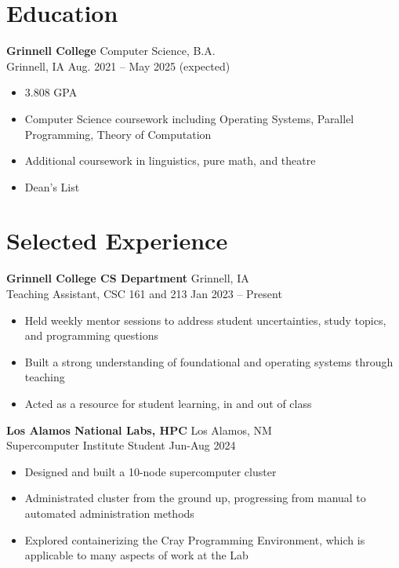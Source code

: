\documentclass[12pt]{article}
\newcommand{\entry}[4]{{{\textbf{#1}}} \hfill #3 \\ #2 \hfill #4}
\begin{document}
\noindent %
\begin{minipage}[t]{0.63\textwidth}

  \section{Education}
  \entry{Grinnell College}{Grinnell, IA}{Computer Science, B.A.}{Aug. 2021 -- May 2025 (expected)}
  \begin{itemize}[noitemsep,leftmargin=3.5mm,rightmargin=0mm,topsep=6pt]
    \item 3.808 GPA
    \item Computer Science coursework including Operating Systems, Parallel Programming, Theory of Computation
    \item Additional coursework in linguistics, pure math, and theatre
    \item Dean's List %
  \end{itemize}


  \section{Selected Experience}
  \entry{Grinnell College CS Department}{Teaching Assistant, CSC 161 and 213}{Grinnell, IA}{Jan 2023 -- Present}
  \begin{itemize}[noitemsep,leftmargin=3.5mm,rightmargin=0mm,topsep=6pt]
    \item Held weekly mentor sessions to address student uncertainties, study topics, and programming questions
    \item Built a strong understanding of foundational and operating systems through teaching
    \item Acted as a resource for student learning, in and out of class
  \end{itemize}

  \medskip

  \entry{Los Alamos National Labs, HPC}{Supercomputer Institute Student}{Los Alamos, NM}{Jun-Aug 2024}
  \begin{itemize}[noitemsep,leftmargin=3.5mm,rightmargin=0mm,topsep=6pt]
    \item Designed and built a 10-node supercomputer cluster
    \item Administrated cluster from the ground up, progressing from manual to automated administration methods
    \item Explored containerizing the Cray Programming Environment, which is applicable to many aspects of work at the Lab
  \end{itemize}


\end{minipage}
\end{document}
